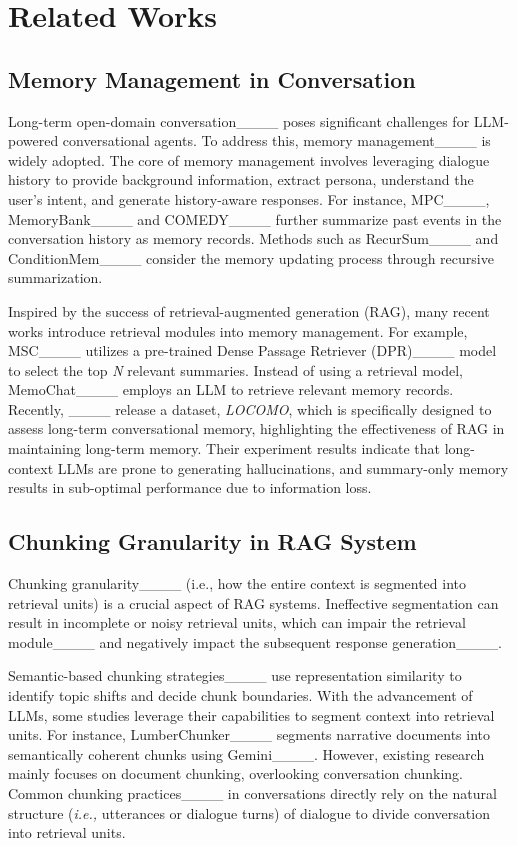 \section{Related Works}
\subsection{Memory Management in Conversation}
Long-term open-domain conversation____ poses significant challenges for LLM-powered conversational agents. To address this, memory management____ is widely adopted. The core of memory management involves leveraging dialogue history to provide background information, extract persona, understand the user's intent, and generate history-aware responses.
For instance, MPC____, MemoryBank____ and COMEDY____ further summarize past events in the conversation history as memory records. Methods such as RecurSum____ and ConditionMem____ consider the memory updating process through recursive summarization.

Inspired by the success of retrieval-augmented generation (RAG), many recent works introduce retrieval modules into memory management. For example, MSC____ utilizes a pre-trained Dense Passage Retriever (DPR)____ model to select the top \textit{N} relevant summaries. 
Instead of using a retrieval model, MemoChat____ employs an LLM to retrieve relevant memory records.
Recently, ____ release a dataset, \textit{LOCOMO}, which is specifically designed to assess long-term conversational memory, highlighting the effectiveness of RAG in maintaining long-term memory. Their experiment results indicate that long-context LLMs are prone to generating hallucinations, and summary-only memory  results in sub-optimal performance due to information loss.

\subsection{Chunking Granularity in RAG System}

Chunking granularity____ (i.e., how the entire context is segmented into retrieval units) is a crucial aspect of RAG systems. Ineffective segmentation can result in incomplete or noisy retrieval units, which can impair the retrieval module____ and negatively impact the subsequent response generation____.

Semantic-based chunking strategies____ use representation similarity to identify topic shifts and decide chunk boundaries. 
With the advancement of LLMs, some studies leverage their capabilities to segment context into retrieval units. For instance, 
LumberChunker____ segments narrative documents into semantically coherent chunks using Gemini____. However, existing research mainly focuses on document chunking, overlooking conversation chunking. Common chunking practices____ in conversations directly rely on the natural structure (\textit{i.e.,} utterances or dialogue turns) of dialogue to divide conversation into retrieval units.

